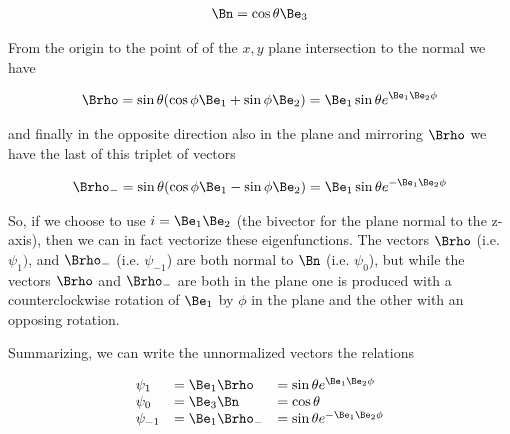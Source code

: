 \begin{align}\label{eqn:foo3}
\Bn = \cos\theta \Be_3 
\end{align}

From the origin to the point of of the $x,y$ plane intersection to the normal we have

\begin{align}\label{eqn:foo4}
\Brho = \sin\theta (\cos\phi \Be_1 + \sin\phi \Be_2) = \Be_1 \sin\theta e^{\Be_1 \Be_2 \phi}
\end{align}

and finally in the opposite direction also in the plane and mirroring $\Brho$ we have the last of this triplet of vectors

\begin{align}\label{eqn:foo5}
\Brho_{-} = \sin\theta (\cos\phi \Be_1 - \sin\phi \Be_2) = \Be_1 \sin\theta e^{-\Be_1 \Be_2 \phi}
\end{align}

So, if we choose to use $i=\Be_1 \Be_2$ (the bivector for the plane normal to the z-axis), then we can in fact vectorize these eigenfunctions.  The vectors $\Brho$ (i.e. $\psi_1)$, and $\Brho_{-}$ (i.e. $\psi_{-1}$) are both normal to $\Bn$ (i.e. $\psi_0$), but while the vectors $\Brho$ and $\Brho_{-}$ are both in the plane one is produced with a counterclockwise rotation of $\Be_1$ by $\phi$ in the plane and the other with an opposing rotation.

Summarizing, we can write the unnormalized vectors the relations

\begin{equation*}
\begin{array}{l l l}%
\psi_1 &= \Be_1 \Brho &= \sin\theta e^{\Be_1\Be_2 \phi} \\
\psi_0 &= \Be_3 \Bn &= \cos\theta \\
\psi_{-1} &= \Be_1 \Brho_{-} &= \sin\theta e^{-\Be_1\Be_2 \phi}
\end{array}
\end{equation*}


